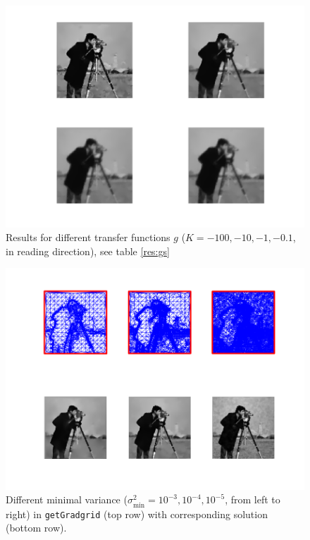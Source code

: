 \documentclass{report}
\begin{document}
\begin{figure}
	\centering
	\includegraphics[]{../out/report_gs.png}
	\caption{Results for different transfer functions $g$ ($K = -100, -10, -1, -0.1$, in reading direction), see table \ref{res:gs}}
	\label{vis:gs}
\end{figure}

\begin{figure}
	\centering
	\includegraphics[]{../out/report_minvars.png}
	\caption{Different minimal variance ($\sigma^2_\text{min} = 10^{-3}, 10^{-4}, 10^{-5}$, from left to right) in \texttt{getGradgrid} (top row) with corresponding solution (bottom row).}
	\label{vis:minvars}
\end{figure}
\end{document}
